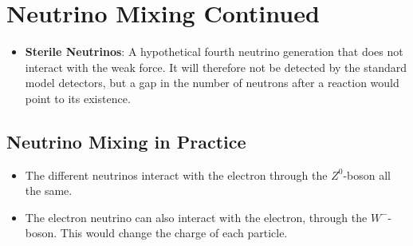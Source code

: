 \section{Neutrino Mixing Continued}
\begin{itemize}
    \item \textbf{Sterile Neutrinos}: A hypothetical fourth neutrino generation that does not interact with the weak force. It will therefore not be detected by the standard model detectors, but a gap in the number of neutrons after a reaction would point to its existence.
\end{itemize}

\subsection{Neutrino Mixing in Practice}
\begin{itemize}
    \item The different neutrinos interact with the electron through the $Z^{0}$-boson all the same. 
    \item The electron neutrino can also interact with the electron, through the $W^{-}$-boson. This would change the charge of each particle. 
\end{itemize}

